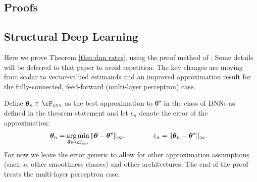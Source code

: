 \documentclass[12pt]{article}
\numberwithin{equation}{section}
\theoremstyle{definition}
\DeclareMathOperator*{\argmin}{arg\,min}
\newcommand{\btheta}{\boldsymbol{\theta}}
\newcommand{\bttrue}{\btheta^\star}
\begin{document}
\newpage
\begin{appendices}
\doublespacing
{}













\section{Proofs}
    \label{appx:proofs}




\subsection{Structural Deep Learning}
    \label{appx:dnn proofs}

    

Here we prove Theorem \ref{thm:dnn rates}, using the proof method of \cite{Farrell-Liang-Misra2021_Ecma}. Some details will be deferred to that paper to avoid repetition. The key changes are moving from scalar to vector-valued estimands and an improved approximation result for the fully-connected, feed-forward (multi-layer perceptron) case. 

Define $\btheta_n \in \cF_{\textsc{dnn}}$ as the best approximation to $\bttrue$ in the class of DNNs as defined in the theorem statement and let $\epsilon_n$ denote the error of the approximation:
\[
    \btheta_n = \argmin_{\btheta \in \cF_{\textsc{dnn}}} \| \btheta - \bttrue \|_{\infty}, 
    \qquad \qquad
    \epsilon_n = \| \btheta_n - \bttrue \|_\infty.
\]
For now we leave the error generic to allow for other approximation assumptions (such as other smoothness classes) and other architectures. The end of the proof treats the multi-layer perceptron case.


\end{appendices}
\end{document}
